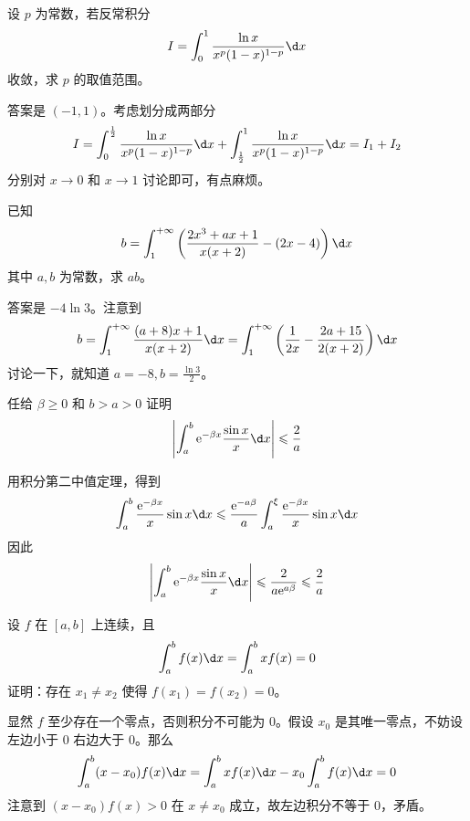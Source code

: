 \begin{problem}[000028]
设 $p$ 为常数，若反常积分
\[ I = \int_{0}^{1} \frac{\ln x}{x^p(1-x)^{1-p}} \d x \]
收敛，求 $p$ 的取值范围。
\end{problem}
\begin{solution}
	答案是 $(-1,1)$。考虑划分成两部分
	\[ I = \int_{0}^{\frac{1}{2}} \frac{\ln x}{x^p(1-x)^{1-p}} \d x + \int_{\frac{1}{2}}^{1} \frac{\ln x}{x^p(1-x)^{1-p}} \d x = I_1 + I_2 \]
	分别对 $x \to 0$ 和 $x \to 1$ 讨论即可，有点麻烦。
\end{solution}

\begin{problem}[000029]
已知
\[ b = \int_{1}^{+\infty} \left(\frac{2x^3 + ax + 1}{x(x+2)} - (2x-4)\right) \d x \]
其中 $a,b$ 为常数，求 $ab$。
\end{problem}
\begin{solution}
	答案是 $-4 \ln 3$。注意到
	\[ b = \int_{1}^{+\infty} \frac{(a+8)x+1}{x(x+2)} \d x= \int_{1}^{+\infty} \left(\frac{1}{2x} - \frac{2a+15}{2(x+2)}\right) \d x \]
	讨论一下，就知道 $a = -8, b = \frac{\ln 3}{2} $。
\end{solution}

\begin{problem}[000044]
任给 $\beta \geqslant 0$ 和 $b > a > 0$ 证明
\[ \left| \int_{a}^{b} \ee^{-\beta x} \frac{\sin x}{x} \d x \right| \leqslant \frac{2}{a} \]
\end{problem}

\begin{solution}
	用积分第二中值定理，得到
	\[ \int_{a}^{b} \frac{\ee^{-\beta x}}{x} \sin x \d x \leqslant \frac{\ee^{-a \beta}}{a} \int_{a}^{\xi} \frac{\ee^{-\beta x}}{x} \sin x \d x \]
	因此
	\[ \left| \int_{a}^{b} \ee^{-\beta x} \frac{\sin x}{x} \d x \right| \leqslant \frac{2}{a \ee^{a \beta}} \leqslant \frac{2}{a} \]
\end{solution}

\begin{problem}[000045]
设 $f$ 在 $[a, b]$ 上连续，且
\[ \int_{a}^{b} f(x) \d x = \int_{a}^{b} x f(x) = 0 \]
证明：存在 $x_1 \neq x_2$ 使得 $f(x_1) = f(x_2) = 0$。
\end{problem}

\begin{solution}
	显然 $f$ 至少存在一个零点，否则积分不可能为 $0$。假设 $x_0$ 是其唯一零点，不妨设左边小于 $0$ 右边大于 $0$。那么
	\[ \int_{a}^{b} (x - x_0) f(x) \d x = \int_{a}^{b} x f(x) \d x - x_0 \int_{a}^{b} f(x) \d x = 0 \]
	注意到 $(x - x_0) f(x) > 0$ 在 $x \neq x_0$ 成立，故左边积分不等于 $0$，矛盾。
\end{solution}

